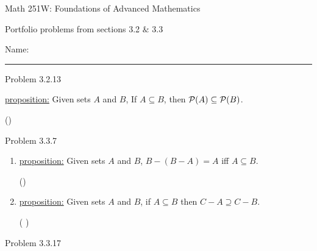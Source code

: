 \documentclass{article}
\theoremstyle{definition}
\begin{document}
	\begin{center}
		\Large{Math 251W: Foundations of Advanced Mathematics}

		\normalsize Portfolio problems from sections 3.2
		$\&$ 3.3

		\hfill Name:
		\hrule \vspace{0.4cm}


		\vspace{0.75cm}
	\end{center}


	\noindent Problem 3.2.13  \vspace{0.3cm}


	\underline{proposition:} Given sets $A$ and $B$, If $A\subseteq B$,
	then ${\cal P}(A)\subseteq {\cal P}(B)$.

	\vspace{.2cm}

	 () \vspace{.15cm}



	\vspace{1cm}


	\noindent Problem 3.3.7  \vspace{0.3cm}

	\begin{enumerate}
		\item[iv]
		\underline{proposition:} Given sets $A$ and $B$, $B-(B-A)=A$ iff
		$A\subseteq B$.

		\vspace{.2cm}

		 () \vspace{.15cm}



		\item[vi]
		\underline{proposition:} Given sets $A$ and $B$, if $A\subseteq B$
		then $C-A\supseteq C-B$.

		\vspace{.2cm}

		 ( ) \vspace{.15cm}


	\end{enumerate}
	\vspace{1cm}



	\noindent Problem 3.3.17  \vspace{0.3cm}
\end{document}
